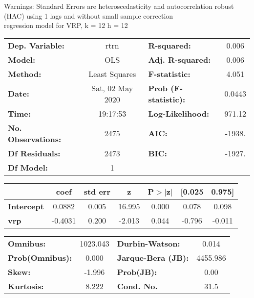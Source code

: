 Warnings: \newline
 [1] Standard Errors are heteroscedasticity and autocorrelation robust (HAC) using 1 lags and without small sample correction\\ 

regression model for VRP, k = 12 h = 12\begin{center}
\begin{tabular}{lclc}
\toprule
\textbf{Dep. Variable:}    &       rtrn       & \textbf{  R-squared:         } &     0.006   \\
\textbf{Model:}            &       OLS        & \textbf{  Adj. R-squared:    } &     0.006   \\
\textbf{Method:}           &  Least Squares   & \textbf{  F-statistic:       } &     4.051   \\
\textbf{Date:}             & Sat, 02 May 2020 & \textbf{  Prob (F-statistic):} &   0.0443    \\
\textbf{Time:}             &     19:17:53     & \textbf{  Log-Likelihood:    } &    971.12   \\
\textbf{No. Observations:} &        2475      & \textbf{  AIC:               } &    -1938.   \\
\textbf{Df Residuals:}     &        2473      & \textbf{  BIC:               } &    -1927.   \\
\textbf{Df Model:}         &           1      & \textbf{                     } &             \\
\bottomrule
\end{tabular}
\begin{tabular}{lcccccc}
                   & \textbf{coef} & \textbf{std err} & \textbf{z} & \textbf{P$> |$z$|$} & \textbf{[0.025} & \textbf{0.975]}  \\
\midrule
\textbf{Intercept} &       0.0882  &        0.005     &    16.995  &         0.000        &        0.078    &        0.098     \\
\textbf{vrp}       &      -0.4031  &        0.200     &    -2.013  &         0.044        &       -0.796    &       -0.011     \\
\bottomrule
\end{tabular}
\begin{tabular}{lclc}
\textbf{Omnibus:}       & 1023.043 & \textbf{  Durbin-Watson:     } &    0.014  \\
\textbf{Prob(Omnibus):} &   0.000  & \textbf{  Jarque-Bera (JB):  } & 4455.986  \\
\textbf{Skew:}          &  -1.996  & \textbf{  Prob(JB):          } &     0.00  \\
\textbf{Kurtosis:}      &   8.222  & \textbf{  Cond. No.          } &     31.5  \\
\bottomrule
\end{tabular}
\end{center}

